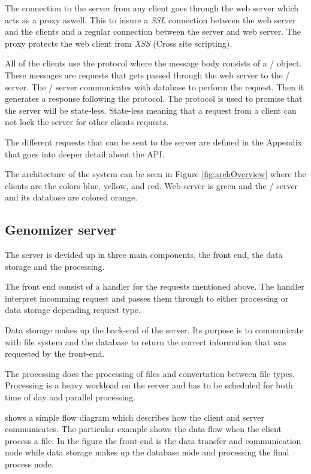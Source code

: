 The connection to the server from any client goes through the web server which acts as a proxy aswell. This to insure a \textit{SSL} connection between the web server and the clients and a regular connection between the server and web server. The proxy protects the web client from \textit{XSS} (Cross site scripting). 

All of the clients use the  protocol where the message body consists of a \json/ object.
These messages are requests that gets passed through the web server to the \appName/ server. The \appName/ server communicates with database to perform the request. Then it generates a response following the  protocol. The  protocol is used to promise that the server will be state-less. State-less meaning that a request from a client can not lock the server for other clients requests. 

The different requests that can be sent to the server are defined in the Appendix  that goes into deeper detail about the API.

The architecture of the system can be seen in Figure \ref{fig:archOverview} where the clients are the colors blue, yellow, and red. Web server is green and the \appName/ server and its database are colored orange.



\subsection{Genomizer server}
The server is devided up in three main components, the front end, the data storage and the processing.

The front end consist of a handler for the  requests mentioned above. The handler interpret incomming request and passes them through to either processing or data storage depending request type.

Data storage makes up the back-end of the server. Its purpose is to communicate with file system and the database to return the correct information that was requested by the front-end.

The processing does the processing of files and convertation between file types. Processing is a heavy workload on the server and has to be scheduled for both time of day and  parallel processing.

 shows a simple flow diagram which describes how the client and server
 communicates. The particular example shows the data flow when the client process a file.
 In the figure the front-end is the data transfer and communication node while data storage makes up the database node and processing the final process node.


